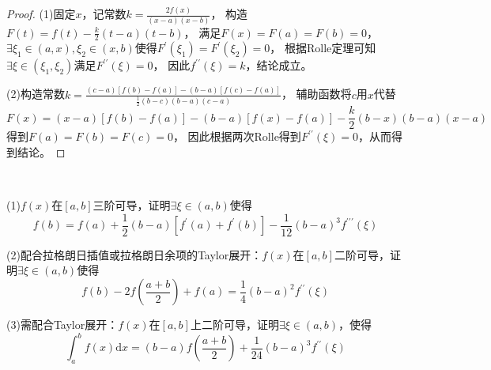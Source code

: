 \begin{proof}
  (1)固定$x$，记常数$k = \frac{2f(x)}{(x - a)(x - b)}$，
  构造$F(t) = f(t )- \frac{k}{2}(t - a)(t - b)$，
  满足$F(x) = F(a) = F(b) = 0$，
  $\exists \xi_1 \in (a,x), \xi_2 \in (x,b)$使得$F^{\prime}(\xi_1) = F^{\prime}(\xi_2) = 0$，
  根据Rolle定理可知$\exists \xi \in (\xi_1,\xi_2)$满足$F^{\prime\prime}(\xi) = 0$，
  因此$f^{\prime\prime}(\xi) = k$，结论成立。

  (2)构造常数$k = \frac{(c - a)[f(b) - f(a)] - (b - a)[f(c) - f(a)]}{\frac{1}{2}(b - c)(b - a)(c - a)}$，
  辅助函数将$c$用$x$代替
  \begin{equation*}
    F(x) = (x - a)[f(b) - f(a)] - (b - a)[f(x) - f(a)] - \frac{k}{2}(b - x)(b - a)(x - a)
  \end{equation*}
  得到$F(a) = F(b) = F(c) = 0$，
  因此根据两次Rolle得到$F^{\prime\prime}(\xi) = 0$，从而得到结论。
\end{proof}

~

\begin{exercise}[另外几道经典题]
  (1)$f(x)$在$[a,b]$三阶可导，证明$\exists \xi \in (a,b)$使得
  \begin{equation*}
    f(b) = f(a) + \frac{1}{2}(b - a)[f^{\prime}(a) + f^{\prime}(b)] - \frac{1}{12}(b - a)^3 f^{\prime\prime\prime}(\xi)
  \end{equation*}

  (2)配合拉格朗日插值或拉格朗日余项的Taylor展开：$f(x)$在$[a,b]$二阶可导，证明$\exists \xi \in (a,b)$使得
  \begin{equation*}
    f(b) - 2f(\frac{a+b}{2}) + f(a) = \frac{1}{4}(b - a)^2 f^{\prime\prime}(\xi)
  \end{equation*}

  (3)需配合Taylor展开：$f(x)$在$[a,b]$上二阶可导，证明$\exists \xi \in (a,b)$，使得
  \begin{equation*}
    \int_a^b f(x)\mathrm{d} x = (b - a)f \left( \frac{a+b}{2} \right) + \frac{1}{24}(b - a)^3f^{\prime\prime}(\xi)
  \end{equation*}
\end{exercise}

